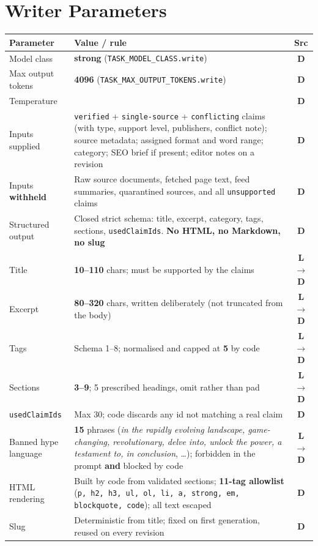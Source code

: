 \documentclass[10pt,a4paper]{article}
\newcommand{\cd}[1]{\texttt{\footnotesize\hyphenpenalty=0\exhyphenpenalty=0\relax #1}}
\newcommand{\us}{\_\discretionary{}{}{}}
\newcommand{\D}{\textcolor{go}{\textbf{D}}}
\newcommand{\LD}{\textcolor{hd}{\textbf{L$\rightarrow$D}}}
\begin{document}
\section{Writer Parameters}

\begin{center}\footnotesize
\begin{tabularx}{\textwidth}{@{}>{\RaggedRight}p{4.4cm} >{\RaggedRight}X c@{}}
\toprule
\textbf{Parameter} & \textbf{Value / rule} & \textbf{Src} \\
\midrule
Model class & \textbf{strong} (\cd{TASK\us MODEL\us CLASS.write}) & \D \\
Max output tokens & \textbf{4096} (\cd{TASK\us MAX\us OUTPUT\us TOKENS.write}) & \D \\
Temperature & 0.3 & \D \\
Inputs supplied & \cd{verified} + \cd{single-source} + \cd{conflicting} claims (with type, support level, publishers, conflict note); source metadata; assigned format and word range; category; SEO brief if present; editor notes on a revision & \D \\
Inputs \textbf{withheld} & Raw source documents, fetched page text, feed summaries, quarantined sources, and all \cd{unsupported} claims & \D \\
Structured output & Closed strict schema: title, excerpt, category, tags, sections, \cd{usedClaimIds}. \textbf{No HTML, no Markdown, no slug} & \D \\
Title & \textbf{10--110} chars; must be supported by the claims & \LD \\
Excerpt & \textbf{80--320} chars, written deliberately (not truncated from the body) & \LD \\
Tags & Schema 1--8; normalised and capped at \textbf{5} by code & \LD \\
Sections & \textbf{3--9}; 5 prescribed headings, omit rather than pad & \LD \\
\cd{usedClaimIds} & Max 30; code discards any id not matching a real claim & \D \\
Banned hype language & \textbf{15} phrases (\emph{in the rapidly evolving landscape, game-changing, revolutionary, delve into, unlock the power, a testament to, in conclusion}, \ldots); forbidden in the prompt \textbf{and} blocked by code & \LD \\
HTML rendering & Built by code from validated sections; \textbf{11-tag allowlist} (\cd{p, h2, h3, ul, ol, li, a, strong, em, blockquote, code}); all text escaped & \D \\
Slug & Deterministic from title; fixed on first generation, reused on every revision & \D \\
\bottomrule
\end{tabularx}
\end{center}
\end{document}
